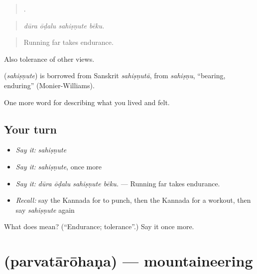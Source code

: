 \begin{quote}
   .
\end{quote}

\begin{quote}
\emph{dūra ōḍalu sahiṣṇute bēku.}
\end{quote}

\begin{quote}
Running far takes endurance.
\end{quote}

Also tolerance of other views.

\begin{cousinweb}
\textbf{} (\emph{sahiṣṇute}) is borrowed from Sanskrit \emph{sahiṣṇutā}, from \emph{sahiṣṇu}, \textquotedblleft{}bearing, enduring\textquotedblright{} (Monier-Williams).
\end{cousinweb}

\begin{grammarlens}[title={What you've built}]
One more word for describing what you lived and felt.
\end{grammarlens}

\subsection*{Your turn}
\begin{itemize}
\raggedright
  \item \emph{Say it:} \emph{sahiṣṇute}
  \item \emph{Say it:} \emph{sahiṣṇute}, once more
  \item \emph{Say it:} \emph{dūra ōḍalu sahiṣṇute bēku.} — Running far takes endurance.
  \item \emph{Recall:} say the Kannada for to punch, then the Kannada for a workout, then say \emph{sahiṣṇute} again
\end{itemize}

\begin{tcolorbox}[breakable,colback=teal!4,colframe=teal!35!black,title={Before you move on}]
What does  mean? (\textquotedblleft{}Endurance; tolerance\textquotedblright{}.) Say it once more.
\end{tcolorbox}
\section[\texorpdfstring{\kn{ಪರ್ವತಾರೋಹಣ} (parvatārōhaṇa)}{ಪರ್ವತಾರೋಹಣ (parvatārōhaṇa)}]{ (parvatārōhaṇa) — mountaineering}

